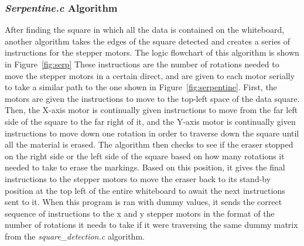 \subsubsection{\textit{Serpentine.c} Algorithm}

After finding the square in which all the data is contained on the whiteboard, another algorithm takes the edges of the square detected and creates a series of instructions for the stepper motors. The logic flowchart of this algorithm is shown in Figure~\ref{fig:serp} These instructions are the number of rotations needed to move the stepper motors in a certain direct, and are given to each motor serially to take a similar path to the one shown in Figure~\ref{fig:serpentine}. First, the motors are given the instructions to move to the top-left space of the data square. Then, the X-axis motor is continually given instructions to move from the far left side of the square to the far right of it, and the Y-axis motor is continually given instructions to move down one rotation in order to traverse down the square until all the material is erased. The algorithm then checks to see if the eraser stopped on the right side or the left side of the square based on how many rotations it needed to take to erase the markings. Based on this position, it gives the final instructions to the stepper motors to move the eraser back to its stand-by position at the top left of the entire whiteboard to await the next instructions sent to it.
When this program is ran with dummy values, it sends the correct sequence of instructions to the x and y stepper motors in the format of the number of rotations it needs to take if it were traversing the same dummy matrix from the \textit{square\_detection.c} algorithm.

